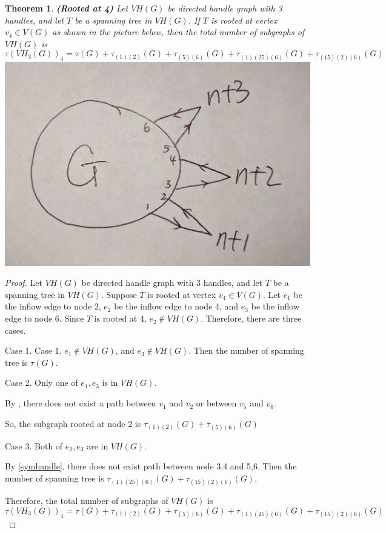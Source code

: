 \documentclass[twoside,11pt]{article}
\newtheorem{theorem}{Theorem}[section]
\numberwithin{equation}{section} \DeclareMathOperator{\Var}{Var}
\newcommand{\bpf}{\begin{proof}}
\newcommand{\epf}{\end{proof}}
\newcommand{\bthm}{\begin{theorem}}
\newcommand{\ethm}{\end{theorem}}
\begin{document}
\bthm
{\bf (Rooted at 4)}
Let $VH(G)$ be directed handle graph with 3 handles, and let $T$ be a spanning tree in $VH(G)$. If $T$ is rooted at vertex $v_4\in V(G)$ as shown in the picture below,
then the total number of subgraphs of $VH(G)$ is  
\[
\tau(VH_3(G))_4 = \tau(G) + \tau_{(1)(2)}(G)+ \tau_{(5)(6)}(G) + \tau_{(1)(25)(6)}(G)+ \tau_{(15)(2)(6)}(G)
\]
\includegraphics[scale=0.025]{graph3_1.jpg}
\ethm

\bpf
Let $VH(G)$ be directed handle graph with 3 handles, and let $T$ be a spanning tree in $VH(G)$. Suppose $T$ is rooted at vertex $v_4\in V(G)$. Let $e_1$ be the inflow edge to node 2, $e_2$ be the inflow edge to node 4, and $e_3$ be the inflow edge to node 6. Since $T$ is rooted at 4, $e_2 \notin VH(G)$. Therefore, there are three cases.

Case 1. Case 1. $e_1\notin VH(G)$, and $e_3\notin VH(G)$. Then the number of spanning tree is $\tau(G)$.

Case 2. Only one of $e_1, e_3$ is in $VH(G)$. 

By , there does not exist a path between $v_1$ and $v_2$ or between $v_5$ and $v_6$.

So, the subgraph rooted at node 2 is $\tau_{(1)(2)}(G)+ \tau_{(5)(6)}(G)$

Case 3. Both of $e_2, e_3$ are in $VH(G)$.

By \cref{symhandle}, there does not exist path between node 3,4 and 5,6. Then the number of spanning tree is $\tau_{(1)(25)(6)}(G)+ \tau_{(15)(2)(6)}(G)$.

Therefore, the total number of subgraphs of $VH(G)$ is  \[
\tau(VH_3(G))_4 = \tau(G) + \tau_{(1)(2)}(G)+ \tau_{(5)(6)}(G) + \tau_{(1)(25)(6)}(G)+ \tau_{(15)(2)(6)}(G)
\]
\epf
\end{document}
